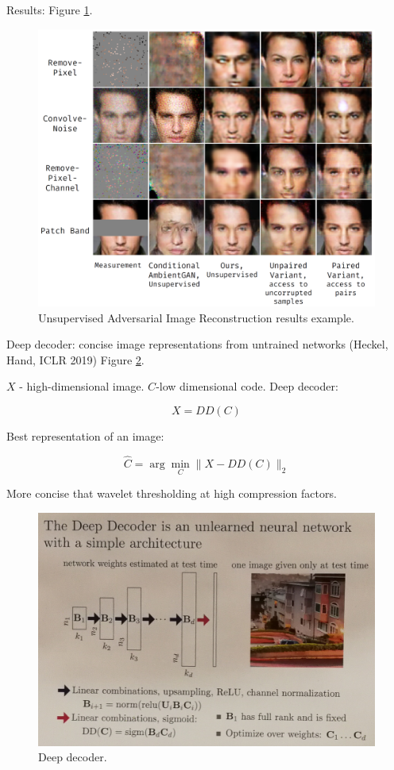 \documentclass[english]{article}
\begin{document}
Results: Figure \ref{UAIRr}.

\begin{figure}
  \centering
  \includegraphics[scale=0.3]{UAIR_results}
  \caption{Unsupervised Adversarial Image Reconstruction results example.}
  \label{UAIRr}
\end{figure}

\item Deep decoder: concise image representations from untrained networks (Heckel, Hand, ICLR 2019) Figure \ref{DD}.

$X$ - high-dimensional image. $C$-low dimensional code. Deep decoder: 

$$X = DD(C)$$

Best representation of an image: 

$$\hat C = \arg\min_C\|X-DD(C)\|_2$$

More concise that wavelet thresholding at high compression factors. 


\begin{figure}
  \centering
  \includegraphics[scale=0.6]{DD}
  \caption{Deep decoder.}
  \label{DD}
\end{figure}
\end{document}
